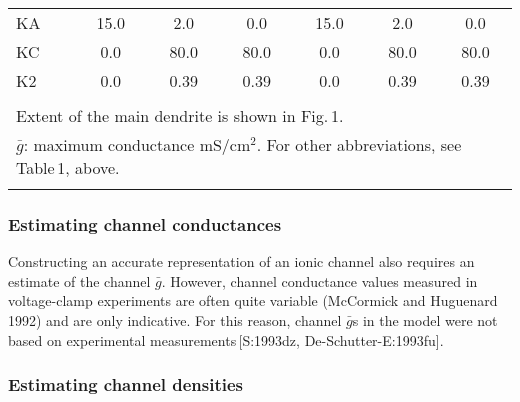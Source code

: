 \documentclass[12pt]{article}
\begin{document}
\begin{table}[!h]
\begin{tabular}{ l c c c c c c }
KA              &15.0             & 2.0                                     & 0.0                              & 15.0             & 2.0                      & 0.0                                                  \\
KC              & 0.0              & 80.0                                   & 80.0                            & 0.0               & 80.0                    & 80.0                                                \\
K2              & 0.0              & 0.39                                    & 0.39                            & 0.0               & 0.39                   & 0.39                                                \\
                   &                     &                                            &                                      &                     &                             &                                                         \\
\multicolumn{7}{l}{Extent of the main dendrite is shown in Fig.\,1.}                                                                                                                                 \\
\multicolumn{7}{l}{$\bar g$: maximum conductance mS/cm$^2$. For other abbreviations, see Table\,1, above.}                                                \\
\multicolumn{7}{l}{}                                                                                                                                                                                                                   \\
\end{tabular}
\end{table}

\subsubsection*{Estimating channel conductances}

Constructing an accurate
representation of an ionic channel also requires an estimate of
the channel $\bar g$. However, channel conductance values measured in
voltage-clamp experiments are often quite variable (McCormick
and Huguenard 1992) and are only indicative. For this reason,
channel $\bar g$s in the model were not based on experimental measurements\,[S:1993dz, De-Schutter-E:1993fu].

\subsubsection*{Estimating channel densities}
\end{document}
